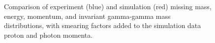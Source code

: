 \begin{figure}[hbt]
	\caption[Simulation and Experiment Matching after Smearing]{Comparison of experiment (blue) and simulation (red) missing mass, energy, momentum, and invariant gamma-gamma mass distributions, with smearing factors added to the simulation data proton and photon momenta.}
	\label{fig:good}
\end{figure}